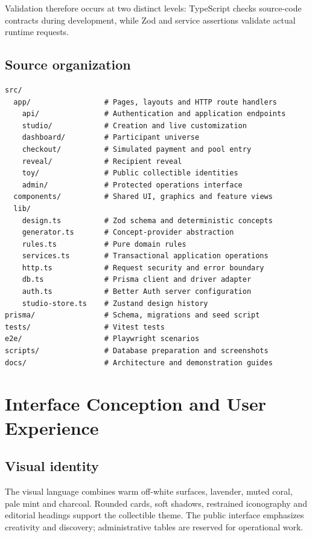 \documentclass[11pt,a4paper]{article}
\begin{document}
Validation therefore occurs at two distinct levels: TypeScript checks source-code contracts during development, while Zod and service assertions validate actual runtime requests.

\subsection{Source organization}
\begin{lstlisting}
src/
  app/                 # Pages, layouts and HTTP route handlers
    api/               # Authentication and application endpoints
    studio/            # Creation and live customization
    dashboard/         # Participant universe
    checkout/          # Simulated payment and pool entry
    reveal/            # Recipient reveal
    toy/               # Public collectible identities
    admin/             # Protected operations interface
  components/          # Shared UI, graphics and feature views
  lib/
    design.ts          # Zod schema and deterministic concepts
    generator.ts       # Concept-provider abstraction
    rules.ts           # Pure domain rules
    services.ts        # Transactional application operations
    http.ts            # Request security and error boundary
    db.ts              # Prisma client and driver adapter
    auth.ts            # Better Auth server configuration
    studio-store.ts    # Zustand design history
prisma/                # Schema, migrations and seed script
tests/                 # Vitest tests
e2e/                   # Playwright scenarios
scripts/               # Database preparation and screenshots
docs/                  # Architecture and demonstration guides
\end{lstlisting}

\section{Interface Conception and User Experience}

\subsection{Visual identity}
The visual language combines warm off-white surfaces, lavender, muted coral, pale mint and charcoal. Rounded cards, soft shadows, restrained iconography and editorial headings support the collectible theme. The public interface emphasizes creativity and discovery; administrative tables are reserved for operational work.
\end{document}
